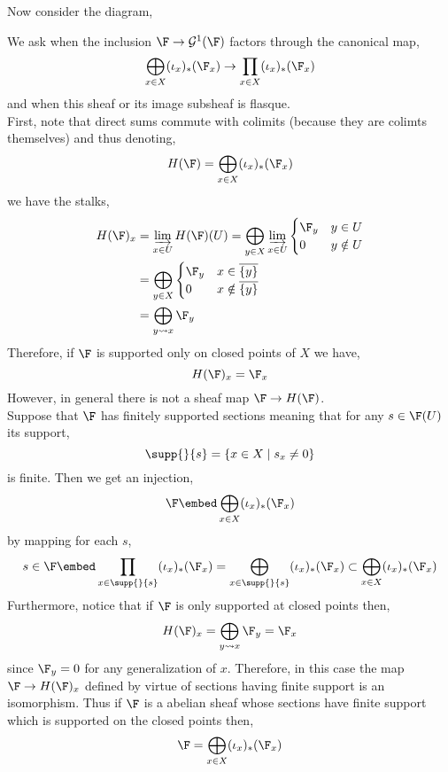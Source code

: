 \documentclass[12pt]{article}
\begin{document}
Now consider the diagram,
\begin{center}
\end{center}
We ask when the inclusion $\F \to \mathcal{G}^1(\F)$ factors through the canonical map,
\[ \bigoplus\limits_{x \in X} (\iota_x)_* (\F_x) \to \prod_{x \in X} (\iota_x)_* (\F_x) \]
and when this sheaf or its image subsheaf is flasque. 
\bigskip\\
First, note that direct sums commute with colimits (because they are colimts themselves) and thus denoting,
\[ H(\F) = \bigoplus_{x \in X} (\iota_x)_* (\F_x) \]
we have the stalks,
\begin{align*}
H(\F)_x & = \varinjlim_{x \in U} H(\F)(U) = \bigoplus_{y \in X} \varinjlim_{x \in U} 
\begin{cases}
\F_y & y \in U
\\
0 & y \notin U
\end{cases}
\\
& = \bigoplus_{y \in X}  
\begin{cases}
\F_y & x \in \overline{\{ y \}}
\\
0 & x \notin \overline{\{ y \}} 
\end{cases}
\\
& = \bigoplus_{y \leadsto x} \F_y 
\end{align*}
Therefore, if $\F$ is supported only on closed points of $X$ we have,
\[ H(\F)_x = \F_x \]
However, in general there is not a sheaf map $\F \to H(\F)$.
\bigskip\\
Suppose that $\F$ has finitely supported sections meaning that for any $s \in \F(U)$ its support,
\[ \supp{}{s} = \{ x \in X \mid s_x \neq 0 \} \]
is finite. Then we get an injection,
\[ \F \embed \bigoplus_{x \in X} (\iota_x)_* (\F_x) \]
by mapping for each $s$,
\[ s \in \F \embed \prod_{x \in \supp{}{s}} (\iota_x)_* (\F_x) = \bigoplus_{x \in \supp{}{s}} (\iota_x)_* (\F_x) \subset \bigoplus_{x \in X} (\iota_x)_* (\F_x) \]
Furthermore, notice that if $\F$ is only supported at closed points then,
\[ H(\F)_x = \bigoplus_{y \leadsto x} \F_y = \F_x \]
since $\F_y = 0$ for any generalization of $x$. Therefore, in this case the map $\F \to H(\F)_x$ defined by virtue of sections having finite support is an isomorphism. Thus if $\F$ is a abelian sheaf whose sections have finite support which is supported on the closed points then,
\[ \F = \bigoplus_{x \in X} (\iota_x)_* (\F_x) \]
\end{document}
